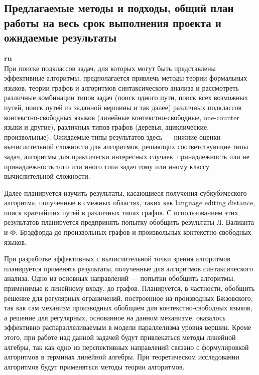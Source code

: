 \documentclass[12pt]{article}  %
\theoremstyle{remark}
\begin{document}
\subsection{Предлагаемые методы и подходы, общий план работы на весь срок выполнения проекта и ожидаемые результаты }

\textbf{ru}\\
При поиске подклассов задач, для которых могут быть представлены эффективные алгоритмы, предполагается привлечь методы теории формальных языков, теории графов и алгоритмов синтаксического анализа и рассмотреть различные комбинации типов задач (поиск одного пути, поиск всех возможных путей, поиск путей из заданной вершины и так далее) различных подклассов контекстно-свободных языков (линейные контекстно-свободные, one-counter языки и другие), различных типов графов (деревья, ациклические, произвольные).
Ожидаемые типы результатов здесь --- нижние оценки вычислительной сложности для алгоритмов, решающих соответствующие типы задач, алгоритмы для практически интересных случаев, принадлежность или не принадлежность того или иного типа задач тому или иному классу вычислительной сложности.

Далее планируется изучить результаты, касающиеся получения субкубического алгоритма, полученные в смежных областях, таких как language editing distance, поиск кратчайших путей в различных типах графов. С использованием этих результатов планируется предпринять попытку обобщить результаты Л. Валианта и Ф. Брэдфорда до произвольных графов и произвольных контекстно-свободных языков.

При разработке эффективных с вычислительной точки зрения алгоритмов планируется применять результаты, полученные для алгоритмов синтаксического анализа. Одно из основных направлений --- попытки обобщить алгоритмы, применимые к линейному входу, до графов. Планируется, в частности, обобщить решение для регулярных ограничений, построенное на производных Бжзовского, так как сам механизм производных обобщаем для контекстно-свободных языков, а решение для регулярных, основанное на данном механизме, оказалось эффективно распараллеливаемым в модели параллелизма уровня вершин. Кроме этого, при работе над данной задачей будут привлекаться методы линейной алгебры, так как одно из перспективных направлений связано с формулировкой алгоритмов в терминах линейной алгебры. При теоретическом исследовании алгоритмов будут применяться методы теории алгоритмов.
\end{document}
